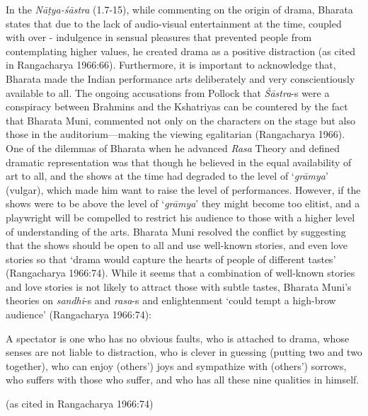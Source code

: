 In the \textsl{Nāṭya-śāstra} (1.7-15), while commenting on the origin of drama, Bharata states that due to the lack of audio-visual entertainment at the time, coupled with over - indulgence in sensual pleasures that prevented people from contemplating higher values, he created drama as a positive distraction (as cited in Rangacharya 1966:66). Furthermore, it is important to acknowledge that, Bharata made the Indian performance arts deliberately and very conscientiously available to all. The ongoing accusations from Pollock
 that \hbox{\textsl{Śāstra}-s} were a conspiracy between Brahmins and the Kshatriyas can be countered by the fact that Bharata Muni, commented not only on the characters on the stage but also those in the auditorium---making the viewing egalitarian (Rangacharya
 1966). One of the dilemmas of Bharata when he advanced \textsl{Rasa} Theory and defined dramatic representation was that though he believed in the equal availability of art to all, and the shows at the time had degraded to the level of ‘\textsl{grāmya}’ (vulgar), which made him want to raise the level of performances. However, if the shows were to be above the level of ‘\textsl{grāmya}' they might become too elitist, and a playwright will be compelled to restrict his audience to those with a higher level of understanding of the arts. Bharata Muni resolved the conflict by suggesting that the shows should be open to all and use well-known stories, and even love stories so that ‘drama would capture the hearts of people of different tastes’ (Rangacharya 1966:74). While it seems that a combination of well-known stories and love stories is not likely to attract those with subtle tastes, Bharata Muni’s theories on \hbox{\textsl{sandhi}-s} and \textsl{rasa}-s and enlightenment ‘could tempt a high-brow audience’ (Rangacharya 1966:74):

\begin{myquote}
A spectator is one who has no obvious faults, who is attached to drama, whose senses are not liable to distraction, who is clever in guessing (putting two and two together), who can enjoy (others’) joys and sympathize with (others’) sorrows, who suffers with those who suffer, and who has all these nine qualities in himself. 

\hfill (as cited in Rangacharya 1966:74)
\end{myquote}

